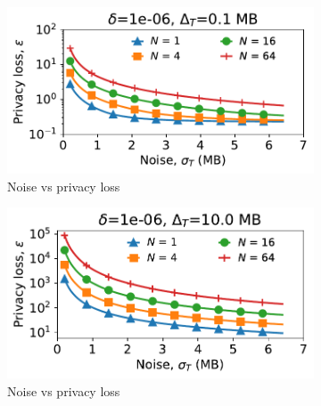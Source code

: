 \begin{figure}[t]
    \centering
    \begin{subfigure}{0.49\columnwidth}
        \includegraphics[width=\textwidth]{privacy_loss_VS_noise_std_low_sensitivity_updated.pdf}
        \caption{Noise vs privacy loss}
        \label{subfig:low-sens-epsilon-sigma}
    \end{subfigure}
    \hfill
    \begin{subfigure}{0.49\columnwidth}
        \includegraphics[width=\textwidth]{privacy_loss_VS_noise_std_high_sensitivity_updated.pdf}
        \caption{Noise vs privacy loss}
        \label{subfig:high-sens-epsilon-sigma}
    \end{subfigure}
    \hfill
\begin{subfigure}{0.49\columnwidth}

\end{subfigure}
\end{figure}
